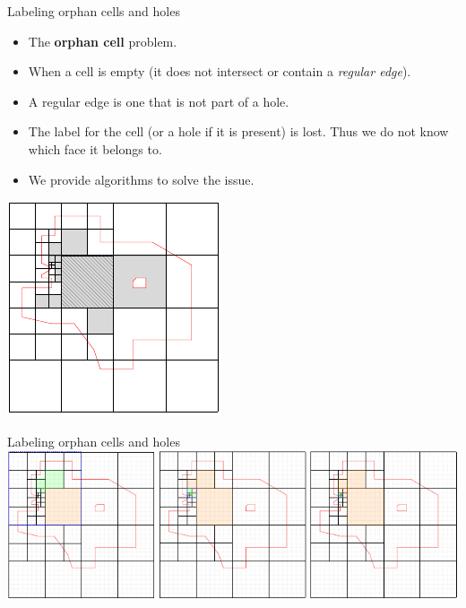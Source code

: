 \documentclass{beamer}
\begin{document}
    \begin{frame}{Labeling orphan cells and holes}
        \begin{minipage}{0.59\textwidth}
            \begin{itemize}
                \item The \textbf{orphan cell} problem.   
                \item When a cell is empty (it does not intersect or contain a \textit{regular edge}).
                \item A regular edge is one that is not part of a hole.
                \item The label for the cell (or a hole if it is present) is lost. Thus we do not know which face it belongs to.
                \item We provide algorithms to solve the issue.  
            \end{itemize}
        \end{minipage}\hfill %
        \begin{minipage}{0.4\textwidth}
            \centering
            \includegraphics[width=\textwidth]{figures/holes1}
            \end{minipage}
    \end{frame}
    
    \begin{frame}{Labeling orphan cells and holes}
        \centering
        \includegraphics[width=\textwidth]{figures/holes2}
    \end{frame}
\end{document}
